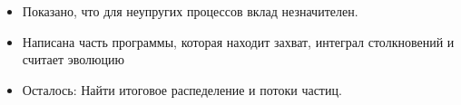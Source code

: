 \begin{itemize}
	\item Показано, что для неупругих процессов вклад незначителен.
	\item Написана часть программы, которая находит захват, интеграл столкновений и считает эволюцию
	\item Осталось: Найти итоговое распеделение и потоки частиц.
\end{itemize}